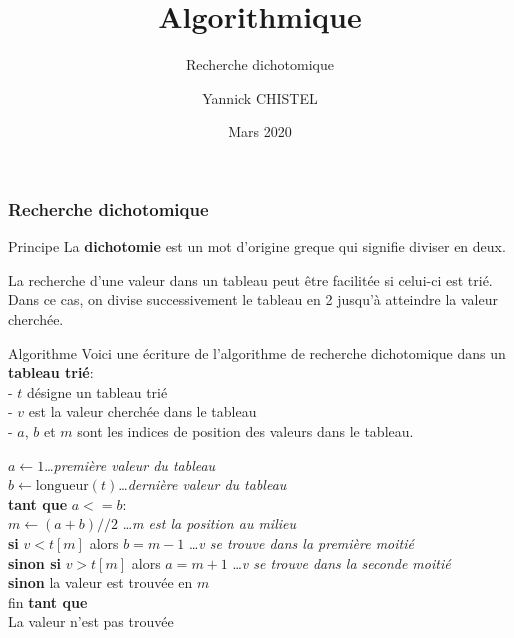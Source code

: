 \documentclass[9pt]{beamer}
\title{Algorithmique}
\subtitle{Recherche dichotomique}
\author{Yannick CHISTEL}
\institute{Lycée Dumont d'Urville-CAEN}
\date{Mars 2020}
\newcommand{\esp}{\hspace{0.5cm}}
\begin{document}
\frame{\titlepage}


\begin{frame}
\frametitle{Recherche dichotomique}

\begin{block}{Principe}
La \textbf{dichotomie} est un mot d'origine greque qui signifie diviser en deux.

La recherche d'une valeur dans un tableau peut être facilitée si celui-ci est trié. Dans ce cas, on divise successivement le tableau en 2 jusqu'à atteindre la valeur cherchée.
\end{block}

\begin{block}{Algorithme}
Voici une écriture de l'algorithme de recherche dichotomique dans un \textbf{tableau trié}:\\
- $t$ désigne un tableau trié\\
- $v$ est la valeur cherchée dans le tableau\\
- $a$, $b$ et $m$ sont les indices de position des valeurs dans le tableau.\medskip

$a \longleftarrow 1$\hfill\ldots\textit{première valeur du tableau}\\
$b \longleftarrow \text{longueur}(t)$\hfill\ldots\textit{dernière valeur du tableau}\\
\textbf{tant que} $a <= b$: \\
\esp$m \longleftarrow (a+b)//2 $ \hfill\ldots\textit{m est la position au milieu}\\
\esp\textbf{si} $v<t[m]$ alors $b=m-1$ \hfill\ldots\textit{v se trouve dans la première moitié}\\
\esp\textbf{sinon si} $v>t[m]$ alors $a=m+1$  \hfill\ldots\textit{v se trouve dans la seconde moitié}\\
\esp\textbf{sinon} la valeur est trouvée en $m$\\
fin \textbf{tant que}\\
La valeur n'est pas trouvée
\end{block}
\end{frame}
\end{document}
